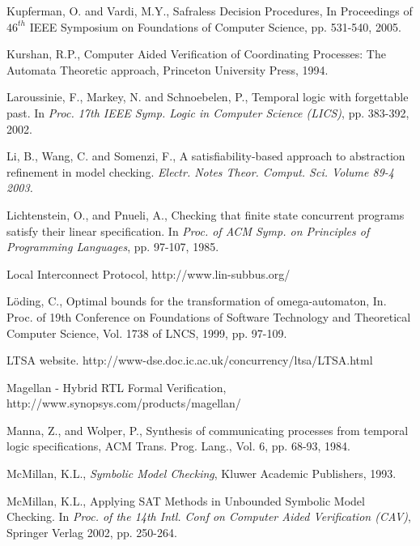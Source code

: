 {\begin{thebibliography}{99}
 Kupferman, O. and Vardi, M.Y., Safraless Decision 
		Procedures, In Proceedings of $46^{th}$ IEEE Symposium on 
		Foundations of Computer Science, pp. 531-540, 2005.

 Kurshan, R.P., Computer Aided Verification 
	of Coordinating Processes: The Automata Theoretic approach,
	Princeton University Press, 1994.


 Laroussinie, F., Markey, N. and Schnoebelen, P., 
	Temporal logic with forgettable past. In {\em Proc. 17th IEEE
	Symp. Logic in Computer Science (LICS)},
	pp. 383-392, 2002.

 Li, B., Wang, C. and Somenzi, F., A 
	satisfiability-based approach to abstraction refinement in 
	model checking. {\em Electr. Notes Theor. Comput. Sci.  
	Volume 89-4 2003.} 

 Lichtenstein, O., and Pnueli, A., Checking that
	finite state concurrent programs satisfy their linear specification.
	In {\em Proc. of ACM Symp. on Principles of Programming Languages},
	pp. 97-107, 1985.

 Local Interconnect Protocol, 
	http://www.lin-subbus.org/ 

 L\"oding, C., Optimal bounds for the transformation of 
		omega-automaton, In. Proc. of 19th Conference on Foundations of 
		Software Technology and Theoretical Computer Science, Vol. 
		1738 of LNCS, 1999, pp. 97-109.

 LTSA website.
    http://www-dse.doc.ic.ac.uk/concurrency/ltsa/LTSA.html 

 Magellan - Hybrid RTL Formal Verification, \\
        http://www.synopsys.com/products/magellan/

 Manna, Z., and Wolper, P., Synthesis of communicating
    processes from temporal logic specifications, ACM Trans. Prog.
    Lang., Vol. 6, pp. 68-93, 1984. 

 McMillan, K.L., {\em Symbolic Model Checking},
	Kluwer Academic Publishers, 1993.

 McMillan, K.L., Applying SAT Methods in Unbounded 
	Symbolic Model Checking. In {\em Proc. of the 14th Intl. Conf on 
	Computer Aided Verification (CAV)}, Springer Verlag 2002, 
	pp. 250-264.


\end{thebibliography}}
